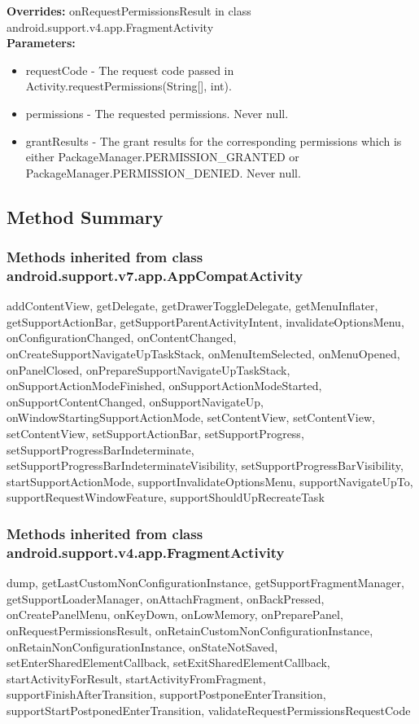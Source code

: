 \textbf{Overrides:}
\tab                   onRequestPermissionsResult in class android.support.v4.app.FragmentActivity\\

\textbf{Parameters:}
\begin{itemize}
\item requestCode - The request code passed in Activity.requestPermissions(String[], int).
\item permissions - The requested permissions. Never null.
\item grantResults - The grant results for the corresponding permissions which is either PackageManager.PERMISSION\_GRANTED or PackageManager.PERMISSION_DENIED. Never null.
\end{itemize}



\subsection{Method Summary}

\subsubsection{Methods inherited from class android.support.v7.app.AppCompatActivity}

addContentView, getDelegate, getDrawerToggleDelegate, getMenuInflater, getSupportActionBar, getSupportParentActivityIntent, invalidateOptionsMenu, onConfigurationChanged, onContentChanged, onCreateSupportNavigateUpTaskStack, onMenuItemSelected, onMenuOpened, onPanelClosed, onPrepareSupportNavigateUpTaskStack, onSupportActionModeFinished, onSupportActionModeStarted, onSupportContentChanged, onSupportNavigateUp, onWindowStartingSupportActionMode, setContentView, setContentView, setContentView, setSupportActionBar, setSupportProgress, setSupportProgressBarIndeterminate, setSupportProgressBarIndeterminateVisibility, setSupportProgressBarVisibility, startSupportActionMode, supportInvalidateOptionsMenu, supportNavigateUpTo, supportRequestWindowFeature, supportShouldUpRecreateTask\\

\subsubsection{Methods inherited from class android.support.v4.app.FragmentActivity}

dump, getLastCustomNonConfigurationInstance, getSupportFragmentManager, getSupportLoaderManager, onAttachFragment, onBackPressed, onCreatePanelMenu, onKeyDown, onLowMemory, onPreparePanel, onRequestPermissionsResult, onRetainCustomNonConfigurationInstance, onRetainNonConfigurationInstance, onStateNotSaved, setEnterSharedElementCallback, setExitSharedElementCallback, startActivityForResult, startActivityFromFragment, supportFinishAfterTransition, supportPostponeEnterTransition, supportStartPostponedEnterTransition, validateRequestPermissionsRequestCode\\

